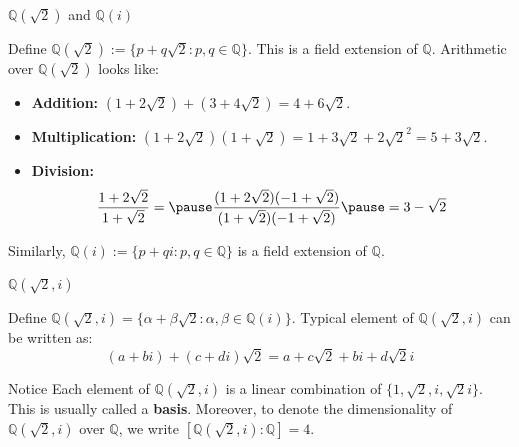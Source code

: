 \documentclass{zkdl-presentation-template}
\begin{document}
    \begin{frame}{$\mathbb{Q}(\sqrt{2})$ and $\mathbb{Q}(i)$}
        \begin{example}
            Define $\mathbb{Q}(\sqrt{2}) := \{p+q\sqrt{2}: p,q \in \mathbb{Q}\}$. This is a field extension of $\mathbb{Q}$.\pause{} Arithmetic over $\mathbb{Q}(\sqrt{2})$ looks like:
            \begin{itemize}
                \item \textbf{Addition:} $(1+2\sqrt{2})+(3+4\sqrt{2})=4+6\sqrt{2}$.\pause
                \item \textbf{Multiplication:} $(1+2\sqrt{2})(1+\sqrt{2}) = 1+3\sqrt{2}+2\sqrt{2}^2 = 5+3\sqrt{2}$.\pause
                \item \textbf{Division:}
                \begin{equation*}
                    \frac{1+2\sqrt{2}}{1+\sqrt{2}}=\pause\frac{(1+2\sqrt{2})(-1+\sqrt{2})}{(1+\sqrt{2})(-1+\sqrt{2})}\pause = 3-\sqrt{2}
                \end{equation*}
            \end{itemize}
        \end{example}
        \pause

        \begin{example}
            Similarly, $\mathbb{Q}(i) := \{p+qi: p,q \in \mathbb{Q}\}$ is a field extension of $\mathbb{Q}$.
        \end{example}
    \end{frame}

    \begin{frame}{$\mathbb{Q}(\sqrt{2}, i)$}
        \begin{example}
            Define $\mathbb{Q}(\sqrt{2}, i) = \{\alpha+\beta\sqrt{2}: \alpha,\beta \in \mathbb{Q}(i)\}$. Typical element of $\mathbb{Q}(\sqrt{2}, i)$ can be written as:\pause
            \begin{equation*}
                (a+bi) + (c+di)\sqrt{2} = a+c\sqrt{2} + bi + d\sqrt{2}i
            \end{equation*}
        \end{example}
        \pause

        \begin{remarkblock}{Notice}
            Each element of $\mathbb{Q}(\sqrt{2}, i)$ is a linear combination of $\{1,\sqrt{2},i,\sqrt{2}i\}$. This is usually called a \textbf{basis}. Moreover, to denote the dimensionality of $\mathbb{Q}(\sqrt{2}, i)$ over $\mathbb{Q}$, we write $[\mathbb{Q}(\sqrt{2}, i):\mathbb{Q}]=4$.
        \end{remarkblock}
    \end{frame}
\end{document}
